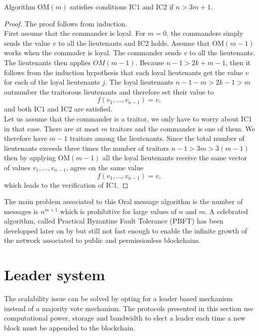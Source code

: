 \begin{theo}
Algorithm $\text{OM}(m)$ satisfies conditions IC1 and IC2 if $n>3m+1$.
\end{theo}
\begin{proof}
The proof follows from induction.\\

\noindent First assume that the commander is loyal. For $m = 0$, the commanders simply sends the value $v$ to all the lieutenants and IC2 holds. Assume that $\text{OM}(m-1)$ works when the commader is loyal. The commander sends $v$ to all the lieutenants. The lieutenants then applies $OM(m-1)$. Because $n-1>2k + m-1$, then it follows from the induction hypothesis that each loyal lieutenants get the value $v$ for each of the loyal lieutenants $j$. The loyal lieutenants $n-1-m > 2k-1>m $ outnumber the traitorous lieutenants and therefore set their value to 
$$
f(v_1,\ldots, v_{n-1}) = v,
$$  
and both IC1 and IC2 are satisfied.\\

\noindent Let us assume that the commander is a traitor, we only have to worry about IC1 in that case. There are at most $m$ traitors and the commander is one of them. We therefore have $m-1$ traitors among the lieutenants. Since the total number of lieutenants exceeds three times the number of traitors $n-1>3m>3(m-1)$ then by applying $\text{OM}(m-1)$ all the loyal lieutenants receive the same vector of values $v_1,\ldots, v_{n-1}$, agree on the same value 
$$
f(v_1,\ldots,v_{n-1}) =v,
$$
which leads to the verification of IC1.
\end{proof}
The main problem associated to this Oral message algorithm is the number of messages is $n^{m+1}$ which is prohibitive for large values of $n$ and $m$. A celebrated algorithm, called Practical Byzantine Fault Tolerance (PBFT) has been developped later on by \citet{10.5555/296806.296824} but still not fast enough to enable the infinite growth of the network associated to public and permissionless blockchains.
\section{Leader system}\label{sec:leader}
The scalability issue can be solved by opting for a leader based mechanism instead of a majority vote mechanism. The protocols presented in this section use computational power, storage and bandwidth to elect a leader each time a new block must be appended to the blockchain.   
